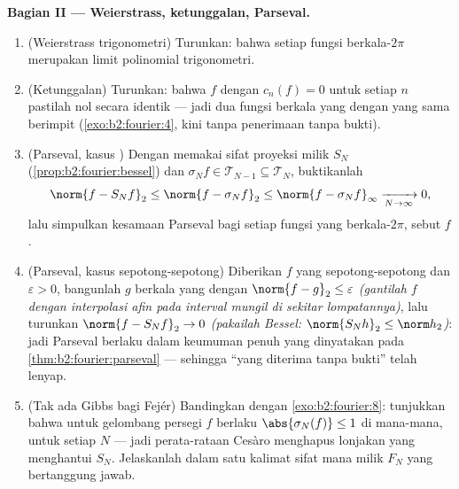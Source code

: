 \begin{problem}
\medskip
\noindent\textbf{Bagian II --- Weierstrass, ketunggalan,
Parseval.}
\begin{enumerate}[resume]
  \item (Weierstrass trigonometri) Turunkan: bahwa setiap fungsi
         berkala-$2\pi$ merupakan limit 
        polinomial trigonometri.
  \item (Ketunggalan) Turunkan: bahwa $f$  dengan $c_n(f) = 0$
        untuk setiap $n$ pastilah nol secara identik --- jadi dua fungsi
        berkala yang  dengan  yang sama
        berimpit (\cref{exo:b2:fourier:4}, kini tanpa
        penerimaan tanpa bukti).
  \item (Parseval, kasus ) Dengan memakai sifat proyeksi
        milik $S_N$ (\cref{prop:b2:fourier:bessel}) dan
        $\sigma_Nf \in \mathcal T_{N-1} \subseteq \mathcal
        T_N$, buktikanlah
        \[
        \norm{f - S_Nf}_2 \leq \norm{f - \sigma_Nf}_2
        \leq \norm{f - \sigma_Nf}_\infty
        \xrightarrow[N\to\infty]{} 0 ,
        \]
        lalu simpulkan kesamaan Parseval bagi setiap fungsi
        \emph{} yang berkala-$2\pi$, sebut $f$.
  \item (Parseval, kasus  sepotong-sepotong) Diberikan $f$
        yang  sepotong-sepotong dan $\varepsilon > 0$, bangunlah
        $g$ berkala yang  dengan $\norm{f - g}_2 \leq
        \varepsilon$ \emph{(gantilah $f$ dengan interpolasi
        afin pada interval mungil di sekitar lompatannya)},
        lalu turunkan $\norm{f - S_Nf}_2 \to 0$
        \emph{(pakailah Bessel: $\norm{S_Nh}_2 \leq \norm h_2$)}: jadi
        Parseval berlaku dalam keumuman penuh yang dinyatakan pada
        \cref{thm:b2:fourier:parseval} --- sehingga ``yang diterima tanpa bukti''
        telah lenyap.
  \item (Tak ada Gibbs bagi Fejér) Bandingkan dengan
        \cref{exo:b2:fourier:8}: tunjukkan bahwa untuk gelombang persegi
        $f$ berlaku $\abs{\sigma_N(f)} \leq 1$ di mana-mana, untuk setiap
        $N$ --- jadi perata-rataan Cesàro menghapus lonjakan yang
        menghantui $S_N$. Jelaskanlah dalam satu kalimat sifat mana
        milik $F_N$ yang bertanggung jawab.
\end{enumerate}


\end{problem}
